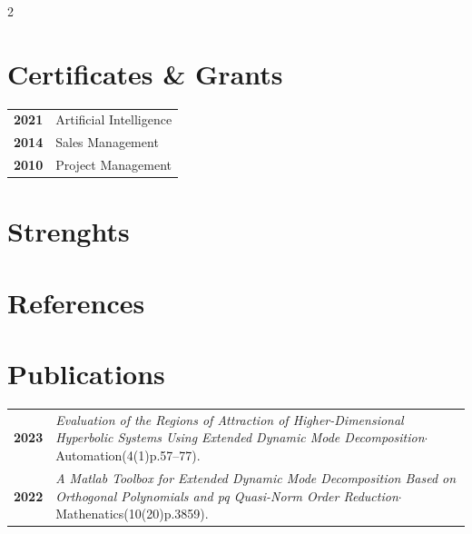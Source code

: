 \documentclass[11pt,a4paper,grey]{hipstercv}
\begin{document}
\begin{paracol}{2}
\begin{minipage}[t]{0.16\textwidth}
		 \hspace{1em}
	\end{minipage}

	\vspace{2em}

	\begin{minipage}[t]{0.3\textwidth}
		\section*{Certificates \& Grants}
		\begin{tabular}{>{\footnotesize\bfseries}r >{\footnotesize}p{}}
			2021 & Artificial Intelligence \\
			2014 & Sales Management        \\
			2010 & Project Management      \\
		\end{tabular}
		\section*{Strenghts}
		\section*{References}
	\end{minipage}\hfill
	\begin{minipage}[t]{0.3\textwidth}
		\section*{Publications}
		\begin{tabular}{>{\footnotesize\bfseries}r >{\footnotesize}p{}}
			2023 & \emph{Evaluation of the Regions of Attraction of Higher-Dimensional Hyperbolic Systems Using Extended Dynamic Mode Decomposition}$\cdot$Automation(4(1)p.57--77).  \\
			2022 & \emph{A Matlab Toolbox for Extended Dynamic Mode Decomposition Based on Orthogonal Polynomials and pq Quasi-Norm Order Reduction}$\cdot$Mathenatics(10(20)p.3859).
		\end{tabular}

\end{minipage}
\end{paracol}
\end{document}
